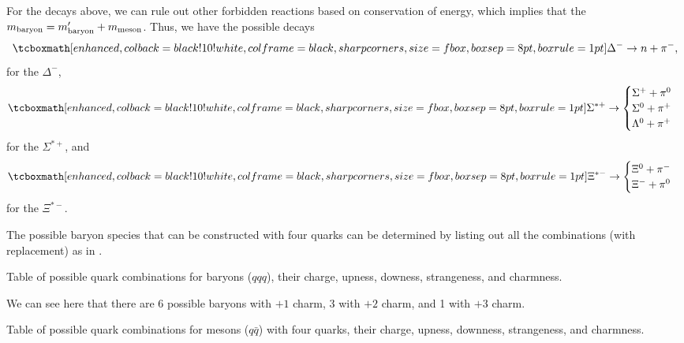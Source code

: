 For the decays above, we can rule out other forbidden reactions based on conservation of energy, which implies that the $m_{\rm baryon} = m'_{\rm baryon} + m_{\rm meson}$.
Thus, we have the possible decays
\begin{align}
    \label{eq:decay-modes-delta-mass}
    \eqbox{
    \Delta^{-} \rightarrow n + \pi^{-}
}
,\end{align}
for the $\Delta^{-}$,
\begin{eqnarray}
    \label{eq:decay-modes-sig_star_plus-mass}
    \eqbox{
    \Sigma^{*+} \rightarrow 
    \begin{cases}
    \Sigma^{+} + \pi^{0} \\
    \Sigma^{0} + \pi^{+} \\
    \Lambda^{0} + \pi^{+}
    \end{cases}
    }    
\end{eqnarray}
for the $\Sigma^{*+}$, and 
\begin{eqnarray}
    \label{eq:decay-modes-Xi_star_minus-mass}
    \eqbox{
    \Xi^{*-} \rightarrow 
    \begin{cases}
    \Xi^{0} + \pi^{-} \\
    \Xi^{-} + \pi^{0} \\
    \end{cases}
}
\end{eqnarray}
for the $\Xi^{*-}$.


The possible baryon species that can be constructed with four quarks can be determined by listing out all the combinations (with replacement) as in .

\begin{table}[H]
\begin{center}

\end{center}
\caption{Table of possible quark combinations for baryons ($qqq$), their charge, upness, downess, strangeness, and charmness.}
\label{tab:possible-baryons}
\end{table}

We can see here that there are 6 possible baryons with $+1$ charm, 3 with $+2$ charm, and 1 with $+3$ charm.


\begin{table}[H]
\begin{center}

\end{center}
\caption{Table of possible quark combinations for mesons ($q\bar{q}$) with four quarks, their charge, upness, downness, strangeness, and charmness.}
\label{tab:possible-mesons}
\end{table}

